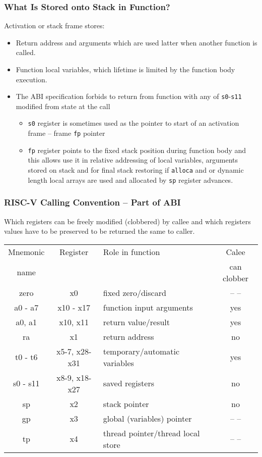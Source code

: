 \documentclass{beamer}
\begin{document}
\begin{frame}
\frametitle{What Is Stored onto Stack in Function?}

Activation or stack frame stores:
\begin{itemize}
 \item Return address and arguments which are used latter when another function is called.
 \item Function local variables, which lifetime is limited by the function body execution.
 \item The ABI specification forbids to return from function with any of \texttt{s0}-\texttt{s11} modified from state at the call
\begin{itemize}
 \item \texttt{s0} register is sometimes used as the pointer to start of an activation frame -- frame \texttt{fp} pointer
 \item \texttt{fp} register points to the fixed stack position during function body and this allows use it in relative addressing of local variables, arguments stored on stack and for final stack restoring if \texttt{alloca} and or dynamic length local arrays are used and allocated by \texttt{sp} register advances.
\end{itemize}
\end{itemize}
\end{frame}


\begin{frame}
\frametitle{RISC-V Calling Convention -- Part of ABI}

Which registers can be freely modified (clobbered) by callee and which registers values have to be preserved to be returned the same to caller.

\begin{tabular}{|c|c|p{4cm}|c|}\hline
Mnemonic & Register & Role in function & Calee \\
   name  &          &       &   can clobber \\ \hline
zero & x0 & fixed zero/discard &  -- --\\\hline
a0 - a7 & x10 - x17 & function input arguments & yes \\\hline
a0, a1 & x10, x11 & return value/result & yes \\\hline
ra & x1 & return address & no \\\hline
t0 - t6 & x5-7, x28-x31 & temporary/automatic variables & yes \\\hline
s0 - s11 & x8-9, x18-x27 & saved registers & no\\\hline
sp & x2 & stack pointer & no\\\hline
gp & x3 & global (variables) pointer & -- --\\\hline
tp & x4 & thread pointer/thread local store & -- --\\\hline
\end{tabular}
\end{frame}
\end{document}
